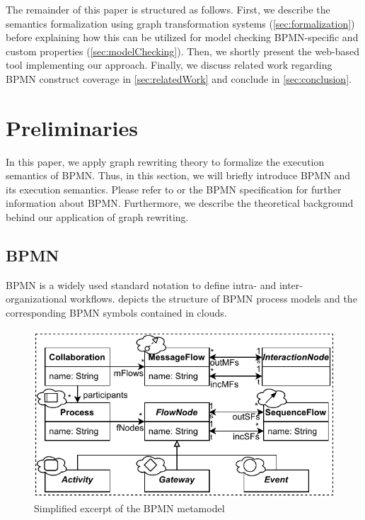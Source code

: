 \documentclass[submission, copyright, creativecommons]{eptcs}
\begin{document}
The remainder of this paper is structured as follows.
First, we describe the semantics formalization using graph transformation systems (\cref{sec:formalization}) before explaining how this can be utilized for model checking BPMN-specific and custom properties (\cref{sec:modelChecking}).
Then, we shortly present the web-based tool implementing our approach.
Finally, we discuss related work regarding BPMN construct coverage in \cref{sec:relatedWork} and conclude in \cref{sec:conclusion}.

\section{Preliminaries}
In this paper, we apply graph rewriting theory to formalize the execution semantics of BPMN.
Thus, in this section, we will briefly introduce BPMN and its execution semantics.
Please refer to \cite{freundRealLifeBPMNUsing2019} or the BPMN specification \cite{objectmanagementgroupBusinessProcessModel2013} for further information about BPMN.
Furthermore, we describe the theoretical background behind our application of graph rewriting.
\subsection{BPMN}
BPMN  is a widely used standard notation to define intra- and inter-organizational workflows.
 depicts the structure of BPMN process models and the corresponding BPMN symbols contained in clouds.

\begin{figure}[h]
  \centering
  \includegraphics[width=0.75\linewidth]{images/bpmn_semantics-bpmn-metamodel.pdf}
  \caption{Simplified excerpt of the BPMN metamodel \cite{objectmanagementgroupBusinessProcessModel2013}}
  \label{fig:bpmnMetamodel}
\end{figure}
\end{document}
